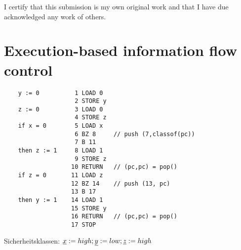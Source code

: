 





\newcommand{\nr}{07}


I certify that this submission is my own original work and that I have due acknowledged any work of others.

\section{Execution-based information flow control}
\begin{lstlisting}
    y := 0          1 LOAD 0
                    2 STORE y
    z := 0          3 LOAD 0
                    4 STORE z
    if x = 0        5 LOAD x
                    6 BZ 8     // push (7,classof(pc))
                    7 B 11
    then z := 1     8 LOAD 1
                    9 STORE z
                   10 RETURN   // (pc,pc) = pop()
    if z = 0       11 LOAD z
                   12 BZ 14    // push (13, pc)
                   13 B 17
    then y := 1    14 LOAD 1
                   15 STORE y
                   16 RETURN   // (pc,pc) = pop()
                   17 STOP
\end{lstlisting}

Sicherheitsklassen: $\underline{x} := high; \underline{y} := low; \underline{z} := high$

